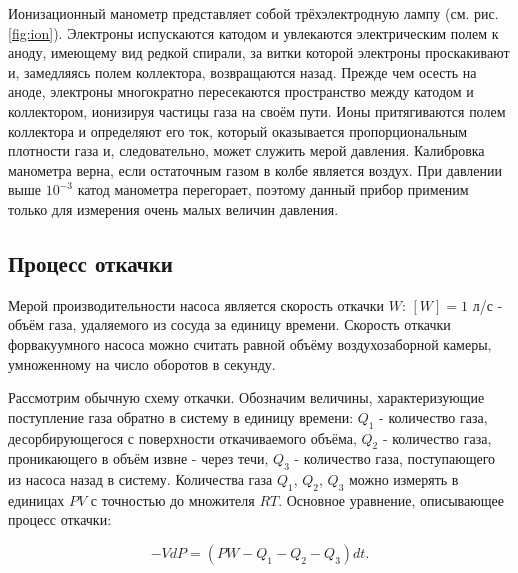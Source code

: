 \documentclass[a4paper,12pt]{article} %
\begin{document}
Ионизационный манометр представляет собой трёхэлектродную лампу (см. рис. \ref{fig:ion}). Электроны испускаются катодом и увлекаются электрическим полем к аноду, имеющему вид редкой спирали, за витки которой электроны проскакивают и, замедляясь полем коллектора, возвращаются назад. Прежде чем осесть на аноде, электроны многократно пересекаются пространство между катодом и коллектором, ионизируя частицы газа на своём пути. Ионы притягиваются полем коллектора и определяют его ток, который оказывается пропорциональным плотности газа и, следовательно, может служить мерой давления. Калибровка манометра верна, если остаточным газом в колбе является воздух. При давлении выше $10^{-3}$ катод манометра перегорает, поэтому данный прибор применим только для измерения очень малых величин давления.

\subsection{Процесс откачки}

Мерой производительности насоса является скорость откачки $W$: $[W] = 1 $ л/с - объём газа, удаляемого из сосуда за единицу времени. Скорость откачки форвакуумного насоса можно считать равной объёму воздухозаборной камеры, умноженному на число оборотов в секунду.

Рассмотрим обычную схему откачки. Обозначим величины, характеризующие поступление газа обратно в систему в единицу времени: $Q_1$ - количество газа, десорбирующегося с поверхности откачиваемого объёма, $Q_2$ - количество газа, проникающего в объём извне - через течи, $Q_3$ - количество газа, поступающего из насоса назад в систему. Количества газа $Q_1$, $Q_2$, $Q_3$ можно измерять в единицах $PV$ с точностью до множителя $RT$. Основное уравнение, описывающее процесс откачки:

\begin{equation}
    -VdP = (PW - Q_1 - Q_2 - Q_3)dt.
    \label{pumpout}
\end{equation}
\end{document}
